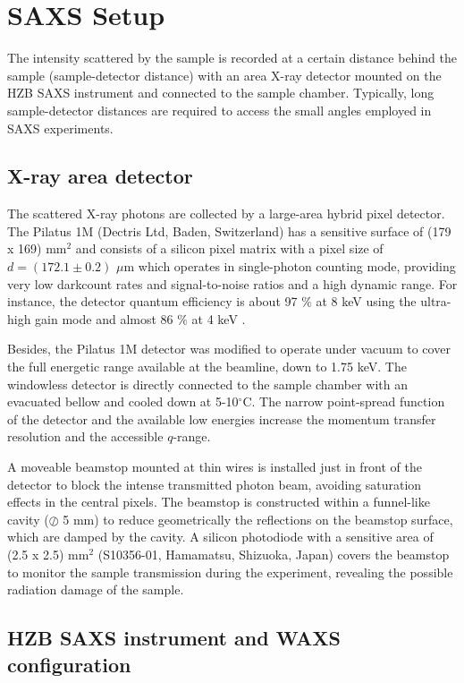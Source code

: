 \section{SAXS Setup}

The intensity scattered by the sample is recorded at a certain distance behind the sample (sample-detector distance) with an area X-ray detector mounted on the HZB SAXS instrument and connected to the sample chamber. Typically, long sample-detector distances are required to access the small angles employed in SAXS experiments.

\subsection{X-ray area detector}

The scattered X-ray photons are collected by a large-area hybrid pixel detector. The Pilatus 1M (Dectris Ltd, Baden, Switzerland) has a sensitive surface of (179 x 169) mm$^2$ and consists of a silicon pixel matrix with a pixel size of $d = (172.1 \pm 0.2)$ $\mu$m which operates in single-photon counting mode, providing very low darkcount rates and signal-to-noise ratios and a high dynamic range. For instance, the detector quantum efficiency is about 97 $\%$ at 8 keV using the ultra-high gain mode and almost 86 $\%$ at 4 keV \citep{wernecke_characterization_2014}.

Besides, the Pilatus 1M detector was modified to operate under vacuum to cover the full energetic range available at the beamline, down to 1.75 keV. The windowless detector is directly connected to the sample chamber with an evacuated bellow and cooled down at 5-10$^{\circ}$C. The narrow point-spread function of the detector and the available low energies increase the momentum transfer resolution and the accessible $q$-range.

A moveable beamstop mounted at thin wires is installed just in front of the detector to block the intense transmitted photon beam, avoiding saturation effects in the central pixels. The beamstop is constructed within a funnel-like cavity ($\oslash$ 5 mm) to reduce geometrically the reflections on the beamstop surface, which are damped by the cavity. A silicon photodiode with a sensitive area of (2.5 x 2.5) mm$^2$ (S10356-01, Hamamatsu, Shizuoka, Japan) covers the beamstop to monitor the sample transmission during the experiment, revealing the possible radiation damage of the sample.

\subsection{HZB SAXS instrument and WAXS configuration}

